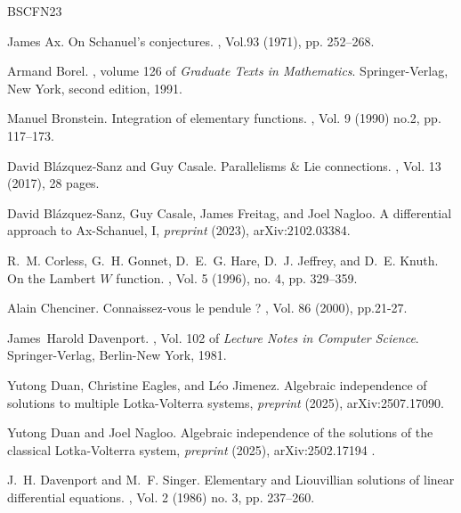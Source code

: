\documentclass[12pt]{amsart}
\theoremstyle{definition}
\theoremstyle{plain}
\theoremstyle{exampstyle}\newtheorem{thmx}{Theorem}
\theoremstyle{exampstyle}\newtheorem{thmxbis}{Theorem}
\begin{document}
\newcommand{\etalchar}[1]{$^{#1}$}
\begin{thebibliography}{BSCFN23}

James Ax.
\newblock On {S}chanuel's conjectures.
, Vol.93 (1971), pp. 252--268.

Armand Borel.
, volume 126 of {\em Graduate Texts in
  Mathematics}.
\newblock Springer-Verlag, New York, second edition, 1991.

Manuel Bronstein.
\newblock Integration of elementary functions.
, Vol. 9 (1990) no.2, pp. 117--173.

David Bl\'{a}zquez-Sanz and Guy Casale.
\newblock Parallelisms \& {L}ie connections.
, Vol. 13 (2017), 28 pages.

David Blázquez-Sanz, Guy Casale, James Freitag, and Joel Nagloo.
\newblock A differential approach to {A}x-{S}chanuel, I, {\em preprint} (2023), 	arXiv:2102.03384.

\bibitem[CGH{\etalchar{+}}96]{Lambert-general}
R.~M. Corless, G.~H. Gonnet, D.~E.~G. Hare, D.~J. Jeffrey, and D.~E. Knuth.
\newblock On the {L}ambert {$W$} function.
, Vol. 5 (1996), no. 4, pp. 329--359.

Alain Chenciner.
\newblock Connaissez-vous le pendule ?
, Vol. 86 (2000), pp.21-27.

James~Harold Davenport.
, Vol. 102 of {\em
  Lecture Notes in Computer Science}.
\newblock Springer-Verlag, Berlin-New York, 1981.

Yutong Duan, Christine Eagles, and Léo Jimenez.
\newblock Algebraic independence of solutions to multiple {L}otka-{V}olterra
  systems, {\em preprint} (2025), arXiv:2507.17090.

Yutong Duan and Joel Nagloo.
\newblock Algebraic independence of the solutions of the classical
  {L}otka-{V}olterra system, {\em preprint} (2025), arXiv:2502.17194 .


J.~H. Davenport and M.~F. Singer.
\newblock Elementary and {L}iouvillian solutions of linear differential
  equations.
, Vol. 2 (1986) no. 3, pp. 237--260.


\end{thebibliography}
\end{document}
